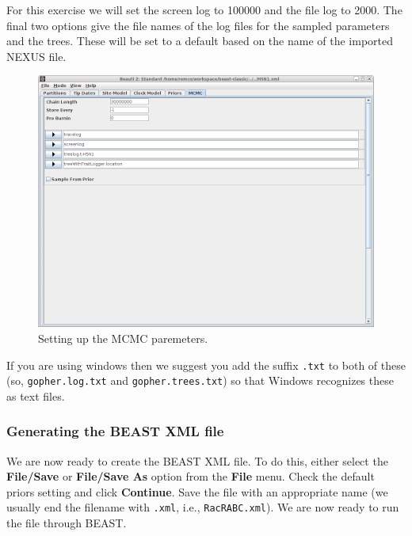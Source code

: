 \documentclass{article}
\begin{document}
For this exercise we will set the screen log to 100000 and the file log to 2000. The final two
options give the file names of the log files for the sampled parameters and
the trees. These will be set to a default based on the name of the
imported NEXUS file. 

\begin{figure}
\begin{center}

\includegraphics[scale=0.4,clip=true,trim=0 200 0 0]{figures/BEAUti_MCMC}

\end{center}
\caption{\label{fig.MCMC} Setting up the MCMC paremeters.}
\end{figure}


If you are using windows then we suggest you add the suffix \texttt{.txt} to both of these (so,
\texttt{gopher.log.txt} and \texttt{gopher.trees.txt}) so that Windows recognizes
these as text files. 











\subsubsection*{Generating the BEAST XML file }

We are now ready to create the BEAST XML file. To do this, either select the {\bf File/Save} or {\bf File/Save As} option from the \textbf{File} menu. Check the default priors setting and click \textbf{Continue}. Save the file with an appropriate name (we usually end the filename with \texttt{.xml}, i.e., \texttt{RacRABC.xml}). We are now ready to run the file through BEAST. 
\end{document}
